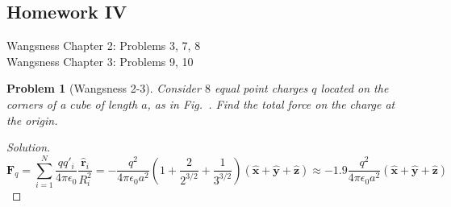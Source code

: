 \documentclass{article}
\theoremstyle{mystyle}
\newtheorem{problem}{Problem}[section]
\begin{document}
\subsection{Homework IV}
Wangsness Chapter 2: Problems 3, 7, 8\\
Wangsness Chapter 3: Problems 9, 10
\begin{problem}[Wangsness 2-3]
    Consider $8$ equal point charges $q$ located on the corners of a cube of length $a$, as in Fig.~. Find the total force on the charge at the origin.
\end{problem}
\begin{proof}[Solution]
\begin{equation*}
    \mathbf{F}_q = \sum_{i=1}^{N} \frac{qq'_i}{4\pi \epsilon_0} \frac{\hat{\mathbf{r}}_i}{R_i^2} = -\frac{q^2}{4\pi \epsilon_0 a^2} (1+\frac{2}{2^{3/2}}+\frac{1}{3^{3/2}})(\hat{\mathbf{x}}+\hat{\mathbf{y}}+\hat{\mathbf{z}}) \approx -1.9\frac{q^{2}}{4\pi \epsilon_{0}a^{2}}(\hat{\mathbf{x}}+\hat{\mathbf{y}}+\hat{\mathbf{z}})
\end{equation*}
\end{proof}
\end{document}
